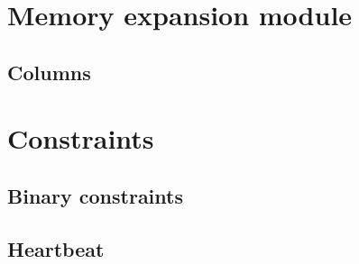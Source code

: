 

\section{Memory expansion module}
\subsection{Columns}               \label{mxp: columns}                
\section{Constraints}
\subsection{Binary constraints}    \label{mxp: constraints: binary}    
\subsection{Heartbeat}             \label{mxp: constraints: heartbeat} 
